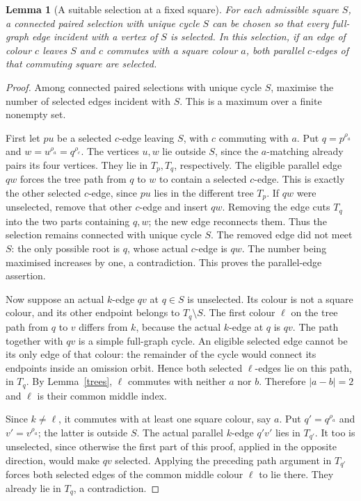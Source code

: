 \documentclass[11pt,a4paper]{article}
\newtheorem{lemma}[theorem]{Lemma}
\begin{document}
\begin{lemma}[A suitable selection at a fixed square]\label{normal}
For each admissible square $S$, a connected paired selection with
unique cycle $S$ can be chosen so that every full-graph edge incident
with a vertex of $S$ is selected. In this selection, if an edge of
colour $c$ leaves $S$ and $c$ commutes with a square colour $a$,
both parallel $c$-edges of that commuting square are selected.
\end{lemma}
\begin{proof}
Among connected paired selections with unique cycle $S$, maximise
the number of selected edges incident with $S$. This is a maximum
over a finite nonempty set.

First let $pu$ be a selected $c$-edge leaving $S$, with $c$
commuting with $a$. Put $q=p^{\rho_a}$ and
$w=u^{\rho_a}=q^{\rho_c}$. The vertices $u,w$ lie outside $S$,
since the $a$-matching already pairs its four vertices. They lie
in $T_p,T_q$, respectively. The eligible parallel edge $qw$
forces the tree path from $q$ to $w$ to contain a selected
$c$-edge. This is exactly the other selected $c$-edge, since
$pu$ lies in the different tree $T_p$. If $qw$ were unselected,
remove that other $c$-edge and insert $qw$. Removing the edge
cuts $T_q$ into the two parts containing $q,w$; the new edge
reconnects them. Thus the selection remains connected with unique
cycle $S$. The removed edge did not meet $S$: the only possible
root is $q$, whose actual $c$-edge is $qw$. The number being
maximised increases by one, a contradiction. This proves the
parallel-edge assertion.

Now suppose an actual $k$-edge $qv$ at $q\in S$ is unselected.
Its colour is not a square colour, and its other endpoint belongs
to $T_q\setminus S$. The first colour $\ell$ on the tree path
from $q$ to $v$ differs from $k$, because the actual $k$-edge at
$q$ is $qv$. The path together with $qv$ is a simple full-graph
cycle. An eligible selected edge cannot be its only edge of that
colour: the remainder of the cycle would connect its endpoints
inside an omission orbit. Hence both selected $\ell$-edges lie
on this path, in $T_q$. By Lemma~\ref{trees}, $\ell$ commutes
with neither $a$ nor $b$. Therefore $|a-b|=2$ and $\ell$ is
their common middle index.

Since $k\ne\ell$, it commutes with at least one square colour,
say $a$. Put $q'=q^{\rho_a}$ and $v'=v^{\rho_a}$; the latter
is outside $S$. The actual parallel $k$-edge $q'v'$ lies in
$T_{q'}$. It too is unselected, since otherwise the first part
of this proof, applied in the opposite direction, would make
$qv$ selected. Applying the preceding path argument in $T_{q'}$
forces both selected edges of the common middle colour $\ell$
to lie there. They already lie in $T_q$, a contradiction.
\end{proof}
\end{document}
